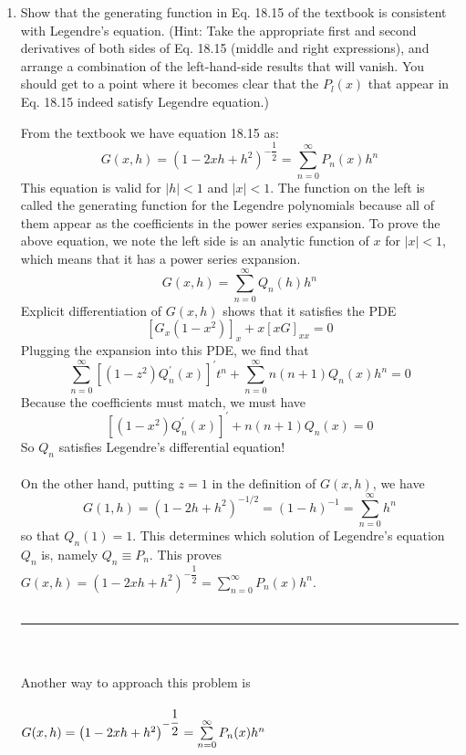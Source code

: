 \documentclass[fleqn]{article}
\begin{document}
\begin{enumerate}
    \item  Show that the generating function in Eq. 18.15 of the textbook is consistent with Legendre's equation.
    (Hint: Take the appropriate first and second derivatives of both sides of Eq. 18.15 (middle and right expressions), and arrange a combination of the left-hand-side results that will vanish.  You should get to a point where it becomes clear that the $P_l(x)$ that appear in Eq. 18.15 indeed satisfy Legendre equation.)

      \textcolor{hwColor}{
        From the textbook we have equation 18.15 as: 
        $$G(x,h)=\left(1-2xh+h^2\right)^{-\dfrac{1}{2}}=\sum\limits_{n=0}^{\infty} P_n(x) h^n$$
        This equation is valid for $|h|<1$ and $|x|<1$. The function on the left is called the generating function for the 
        Legendre polynomials because all of them appear as the coefficients in the power series expansion. To prove the
        above equation, we note the left side is an analytic function of $x$ for $|x|<1$, which means that it has a power series expansion.
        $$G(x,h)=\sum\limits_{n=0}^{\infty} Q_n(h) h^n$$
        Explicit differentiation of $G(x,h)$ shows that it satisfies the PDE 
        $$\left[G_x(1-x^2)\right]_x+x\left[xG\right]_{xx}=0$$
        Plugging the expansion into this PDE, we find that \\
        $$\sum\limits_{n=0}^{\infty} \left[\left(1-z^2\right) Q^'_n(x) \right]^' t^n+\sum\limits_{n=0}^{\infty} n \left(n+1\right) Q_n(x) h^n=0$$
        Because the coefficients must match, we must have
        $$\left[\left(1-x^2\right) Q^'_n(x) \right]^'+n \left(n+1\right) Q_n(x)=0$$
        So $Q_n$ satisfies Legendre’s differential equation! \\
        \\
        On the other hand, putting $z=1$ in the definition of $G(x,h)$, we have
        $$G(1,h)=\left(1-2h+h^2\right)^{-1/2}=\left(1-h\right)^{-1}=\sum\limits_{n=0}^{\infty} h^n$$
        so that $Q_n(1)=1$. This determines which solution of Legendre’s equation $Q_n$ is, namely $Q_n \equiv P_n$. 
        This proves $G(x,h)=\left(1-2xh+h^2\right)^{-\dfrac{1}{2}}=\sum\limits_{n=0}^{\infty} P_n(x) h^n$.
        \\
        \\
        \rule{15cm}{1pt}
        \\
        \\
        Another way to approach this problem is \\
        \\
        $G(x,h)=\left(1-2xh+h^2\right)^{-\dfrac{1}{2}}=\sum\limits_{n=0}^{\infty} P_n(x) h^n \\$
}
\end{enumerate}
\end{document}
